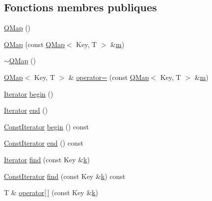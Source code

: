 \subsection*{Fonctions membres publiques}
\begin{DoxyCompactItemize}
\item 
\hyperlink{class_q_map_a72c9b87bd2e154fc1a0afc0bd6cc4223}{Q\+Map} ()
\item 
\hyperlink{class_q_map_a2cf7810ecb7acc088ca19c64e287432d}{Q\+Map} (const \hyperlink{class_q_map}{Q\+Map}$<$ Key, T $>$ \&\hyperlink{060__command__switch_8tcl_a78d127e8bda64d4471ac811ad512fbd9}{m})
\item 
\hyperlink{class_q_map_aa171c2af7b745664c156055dc53a3929}{$\sim$\+Q\+Map} ()
\item 
\hyperlink{class_q_map}{Q\+Map}$<$ Key, T $>$ \& \hyperlink{class_q_map_a2e06720686f4ade87f059e42cf568ab2}{operator=} (const \hyperlink{class_q_map}{Q\+Map}$<$ Key, T $>$ \&\hyperlink{060__command__switch_8tcl_a78d127e8bda64d4471ac811ad512fbd9}{m})
\item 
\hyperlink{class_q_map_aa920e1d34440b34269b350ab96bd73d0}{Iterator} \hyperlink{class_q_map_a639a776efedf32becf3bf97d0cc8bc6e}{begin} ()
\item 
\hyperlink{class_q_map_aa920e1d34440b34269b350ab96bd73d0}{Iterator} \hyperlink{class_q_map_abd36bc62901297a50e7ef45e94bd719e}{end} ()
\item 
\hyperlink{class_q_map_afa9389e1d78c9571f1353fdbf0b267b4}{Const\+Iterator} \hyperlink{class_q_map_abe32a824345f6d8635a1ccfd578db390}{begin} () const 
\item 
\hyperlink{class_q_map_afa9389e1d78c9571f1353fdbf0b267b4}{Const\+Iterator} \hyperlink{class_q_map_ad53569e51ddb39daec15f3e61a5f9460}{end} () const 
\item 
\hyperlink{class_q_map_aa920e1d34440b34269b350ab96bd73d0}{Iterator} \hyperlink{class_q_map_a70dc38ad3663dbb8aacf657711a9acee}{find} (const Key \&\hyperlink{060__command__switch_8tcl_a20363f854eb4098a446733d63d34dbc1}{k})
\item 
\hyperlink{class_q_map_afa9389e1d78c9571f1353fdbf0b267b4}{Const\+Iterator} \hyperlink{class_q_map_ab35bb7a3c210ae10c52f61ce18891005}{find} (const Key \&\hyperlink{060__command__switch_8tcl_a20363f854eb4098a446733d63d34dbc1}{k}) const 
\item 
T \& \hyperlink{class_q_map_acafebec45466a5329663be6129afcb00}{operator\mbox{[}$\,$\mbox{]}} (const Key \&\hyperlink{060__command__switch_8tcl_a20363f854eb4098a446733d63d34dbc1}{k})
\item 

\end{DoxyCompactItemize}
